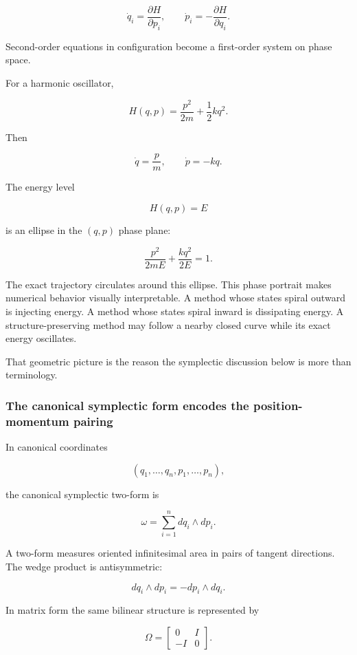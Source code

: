 \[
\boxed{
\dot q_i
=
\frac{\partial H}{\partial p_i},
\qquad
\dot p_i
=
-
\frac{\partial H}{\partial q_i}
}.
\]

Second-order equations in configuration become a first-order system on phase space.

For a harmonic oscillator,

\[
H(q,p)
=
\frac{p^2}{2m}
+
\frac12kq^2.
\]

Then

\[
\dot q=\frac pm,
\qquad
\dot p=-kq.
\]

The energy level

\[
H(q,p)=E
\]

is an ellipse in the \((q,p)\) phase plane:

\[
\frac{p^2}{2mE}
+
\frac{kq^2}{2E}
=
1.
\]

The exact trajectory circulates around this ellipse. This phase portrait makes numerical behavior visually interpretable. A method whose states spiral outward is injecting energy. A method whose states spiral inward is dissipating energy. A structure-preserving method may follow a nearby closed curve while its exact energy oscillates.

That geometric picture is the reason the symplectic discussion below is more than terminology.

\subsubsection{The canonical symplectic form encodes the position-momentum pairing}\label{02-foundations-ii-ch025-the-canonical-symplectic-form-encodes-the-position-momentum-pairing}

\hypertarget{02-foundations-ii-ch025-the-canonical-symplectic-form-encodes-the-position-momentum-pairing}{}

In canonical coordinates

\[
(q_1,\ldots,q_n,p_1,\ldots,p_n),
\]

the canonical symplectic two-form is

\[
\boxed{
\omega
=
\sum_{i=1}^{n}
dq_i\wedge dp_i
}.
\]

A two-form measures oriented infinitesimal area in pairs of tangent directions. The wedge product is antisymmetric:

\[
dq_i\wedge dp_i
=
-
dp_i\wedge dq_i.
\]

In matrix form the same bilinear structure is represented by

\[
\Omega
=
\begin{bmatrix}
0&I\\
-I&0
\end{bmatrix}.
\]

